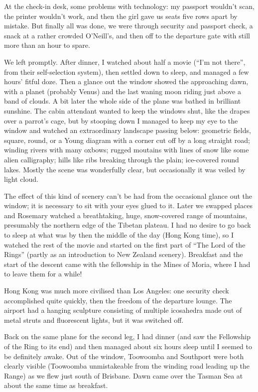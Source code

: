 \documentclass[12pt,a4paper]{article}
\begin{document}
At the check-in desk, some problems with technology: my passport wouldn't
scan, the printer wouldn't work, and then the girl gave us seats five
rows apart by mistake. But finally all was done, we were through security
and passport check, a snack at a rather crowded O'Neill's, and then off
to the departure gate with still more than an hour to spare.

We left promptly. After dinner, I watched about half a movie (``I'm not
there'', from their self-selection system), then settled down to sleep,
and managed a few hours' fitful doze. Then a glance out the window showed
the approaching dawn, with a planet (probably Venus) and the last waning
moon riding just above a band of clouds.
A bit later the whole side of the plane was
bathed in brilliant sunshine. The cabin attendant wanted to keep the
windows shut, like the drapes over a parrot's cage, but by stooping down
I managed to keep my eye to the window and watched an extraordinary
landscape passing below: geometric fields, square, round, or a Young
diagram with a corner cut off by a long straight road; winding rivers
with many oxbows; rugged moutains with lines of snow like some alien
calligraphy; hills like ribs breaking through the plain; ice-covered
round lakes. Mostly the scene was wonderfully clear, but occasionally
it was veiled by light cloud.

The effect of this kind of scenery can't be had from the occasional glance
out the window; it is necessary to sit with your eyes glued to it. Later we
swapped places and Rosemary watched a breathtaking, huge, snow-covered
range of mountains, presumably the northern edge of the Tibetan plateau.
I had no desire to go back to sleep at what was by then the middle of the
day (Hong Kong time), so I watched the rest of the movie and started on
the first part of ``The Lord of the Rings'' (partly as an introduction to
New Zealand scenery). Breakfast and the start of the descent came with
the fellowship in the Mines of Moria, where I had to leave them for a
while!

Hong Kong was much more civilised than Los Angeles: one security check
accomplished quite quickly, then the freedom of the departure lounge.
The airport had a hanging sculpture consisting of multiple icosahedra
made out of metal struts and fluorescent lights, but it was switched off.

Back on the same plane for the second leg, I had dinner (and saw the
Fellowship of the Ring to its end) and then managed
about six hours sleep until I seemed to be definitely awake. Out of the
window, Toowoomba and Southport were both clearly visible (Toowoomba
unmistakeable from the winding road leading up the Range) as we flew
just south of Brisbane. Dawn came over the Tasman Sea at about the same
time as breakfast.
\end{document}
